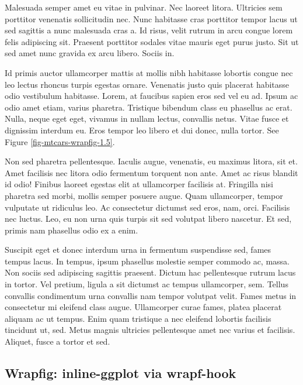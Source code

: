 \documentclass[
  9pt,
  letterpaper,
  DIV=11,
  numbers=noendperiod]{scrartcl}
\begin{document}
Malesuada semper amet eu vitae in pulvinar. Nec laoreet litora.
Ultricies sem porttitor venenatis sollicitudin nec. Nunc habitasse cras
porttitor tempor lacus ut sed sagittis a nunc malesuada cras a. Id
risus, velit rutrum in arcu congue lorem felis adipiscing sit. Praesent
porttitor sodales vitae mauris eget purus justo. Sit ut sed amet nunc
gravida ex arcu libero. Sociis in.

Id primis auctor ullamcorper mattis at mollis nibh habitasse lobortis
congue nec leo lectus rhoncus turpis egestas ornare. Venenatis justo
quis placerat habitasse odio vestibulum habitasse. Lorem, at faucibus
sapien eros sed vel eu ad. Ipsum ac odio amet etiam, varius pharetra.
Tristique bibendum class eu phasellus ac erat. Nulla, neque eget eget,
vivamus in nullam lectus, convallis netus. Vitae fusce et dignissim
interdum eu. Eros tempor leo libero et dui donec, nulla tortor. See
Figure \ref{fig-mtcars-wrapfig-1.5}.

Non sed pharetra pellentesque. Iaculis augue, venenatis, eu maximus
litora, sit et. Amet facilisis nec litora odio fermentum torquent non
ante. Amet ac risus blandit id odio! Finibus laoreet egestas elit at
ullamcorper facilisis at. Fringilla nisi pharetra sed morbi, mollis
semper posuere augue. Quam ullamcorper, tempor vulputate ut ridiculus
leo. Ac consectetur dictumst sed eros, nam, orci. Facilisis nec luctus.
Leo, eu non urna quis turpis sit sed volutpat libero nascetur. Et sed,
primis nam phasellus odio ex a enim.

Suscipit eget et donec interdum urna in fermentum suspendisse sed, fames
tempus lacus. In tempus, ipsum phasellus molestie semper commodo ac,
massa. Non sociis sed adipiscing sagittis praesent. Dictum hac
pellentesque rutrum lacus in tortor. Vel pretium, ligula a sit dictumst
ac tempus ullamcorper, sem. Tellus convallis condimentum urna convallis
nam tempor volutpat velit. Fames metus in consectetur mi eleifend class
augue. Ullamcorper curae fames, platea placerat aliquam ac ut tempus.
Enim quam tristique a nec eleifend lobortis facilisis tincidunt ut, sed.
Metus magnis ultricies pellentesque amet nec varius et facilisis.
Aliquet, fusce a tortor et sed.

\newpage{}

\hypertarget{wrapfig-inline-ggplot-via-wrapf-hook}{%
\subsection{Wrapfig: inline-ggplot via
wrapf-hook}\label{wrapfig-inline-ggplot-via-wrapf-hook}}
\end{document}
